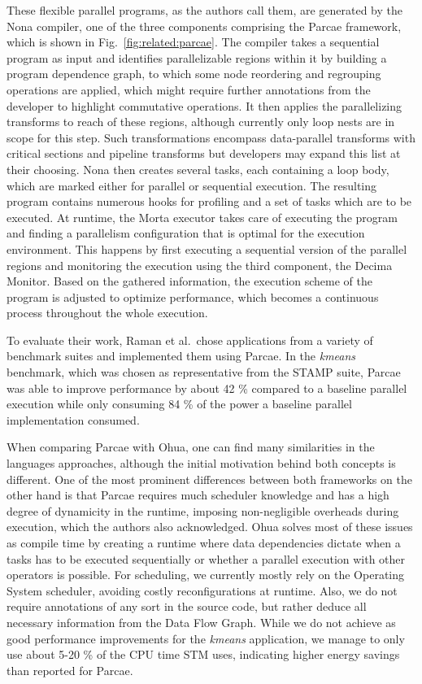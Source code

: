These flexible parallel programs, as the authors call them, are generated by the Nona compiler, one of the three components comprising the Parcae framework, which is shown in Fig.~\ref{fig:related:parcae}.
The compiler takes a sequential program as input and identifies parallelizable regions within it by building a program dependence graph, to which some node reordering and regrouping operations are applied, which might require further annotations from the developer to highlight commutative operations.
It then applies the parallelizing transforms to reach of these regions, although currently only loop nests are in scope for this step.
Such transformations encompass data-parallel transforms with critical sections and pipeline transforms but developers may expand this list at their choosing.
Nona then creates several tasks, each containing a loop body, which are marked either for parallel or sequential execution.
The resulting program contains numerous hooks for profiling and a set of tasks which are to be executed.
At runtime, the Morta executor takes care of executing the program and finding a parallelism configuration that is optimal for the execution environment.
This happens by first executing a sequential version of the parallel regions and monitoring the execution using the third component, the Decima Monitor.
Based on the gathered information, the execution scheme of the program is adjusted to optimize performance, which becomes a continuous process throughout the whole execution.

To evaluate their work, Raman et al.\ chose applications from a variety of benchmark suites and implemented them using Parcae.
In the \emph{kmeans} benchmark, which was chosen as representative from the STAMP suite, Parcae was able to improve performance by about 42 \% compared to a baseline parallel execution while only consuming 84 \% of the power a baseline parallel implementation consumed.

When comparing Parcae with Ohua, one can find many similarities in the languages approaches, although the initial motivation behind both concepts is different.
One of the most prominent differences between both frameworks on the other hand is that Parcae requires much scheduler knowledge and has a high degree of dynamicity in the runtime, imposing non-negligible overheads during execution, which the authors also acknowledged.
Ohua solves most of these issues as compile time by creating a runtime where data dependencies dictate when a tasks has to be executed sequentially or whether a parallel execution with other operators is possible.
For scheduling, we currently mostly rely on the Operating System scheduler, avoiding costly reconfigurations at runtime.
Also, we do not require annotations of any sort in the source code, but rather deduce all necessary information from the Data Flow Graph.
While we do not achieve as good performance improvements for the \emph{kmeans} application, we manage to only use about 5-20 \% of the CPU time STM uses, indicating higher energy savings than reported for Parcae.
